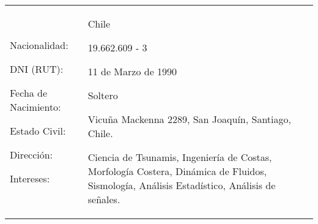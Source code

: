 

\begin{tabularx}{\textwidth}{p{4cm}X X@{}} %
Nacionalidad: \par
DNI (RUT): \par
Fecha de Nacimiento: \par
Estado Civil:  \par
Dirección: \par
Intereses:
&
Chile \par
19.662.609 - 3 \par
11 de Marzo de 1990 \par
Soltero \par
Vicu\~{n}a Mackenna 2289, San Joaquín, Santiago, Chile.\par
Ciencia de Tsunamis, Ingeniería de Costas, Morfología Costera, Dinámica de Fluidos, Sismología, Análisis Estadístico, Análisis de señales. 
\\
\end{tabularx}
